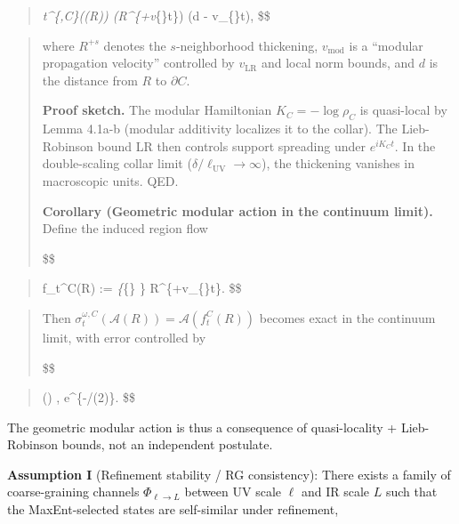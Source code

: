 \documentclass[11pt,a4paper]{article}
\theoremstyle{remark}
\begin{document}
\begin{quote}
\sigma\emph{t\^{}\{\omega,C\}((R)) \subseteq {}(R\^{}\{+v}\{\}\textbar t\textbar\})
\quad {} \eta(d - v\_\{\}\textbar t\textbar),
\$\$
\end{quote}

\begin{quote}
where \(R^{+s}\) denotes the \(s\)-neighborhood thickening, \(v_{\mathrm{mod}}\) is a
``modular propagation velocity'' controlled by \(v_{\mathrm{LR}}\) and local norm
bounds, and \(d\) is the distance from \(R\) to \(\partial C\).

\textbf{Proof sketch.} The modular Hamiltonian \(K_C = -\log \rho_C\) is quasi-local
by Lemma 4.1a-b (modular additivity localizes it to the collar). The
Lieb-Robinson bound LR then controls support spreading under \(e^{iK_C t}\).
In the double-scaling collar limit (\(\delta/\ell_{\mathrm{UV}} \to \infty\)),
the thickening vanishes in macroscopic units. QED.

\textbf{Corollary (Geometric modular action in the continuum limit).} Define the
induced region flow

\$\$
\end{quote}

\begin{quote}
f\_t\^{}C(R) := \lim\emph{\{\ell}\{\} \} R\^{}\{+v\_\{\}\textbar t\textbar\}.
\$\$
\end{quote}

\begin{quote}
Then \(\sigma_t^{\omega,C}(\mathcal{A}(R)) = \mathcal{A}(f_t^C(R))\) becomes
exact in the continuum limit, with error controlled by

\$\$
\end{quote}

\begin{quote}
\eta(\delta)  , e\^{}\{-\delta/(2\xi)\}.
\$\$
\end{quote}

The geometric modular action is thus a consequence of quasi-locality + Lieb-Robinson bounds, not an independent postulate.

\textbf{Assumption I} (Refinement stability / RG consistency): There exists a family
of coarse-graining channels \(\Phi_{\ell\to L}\) between UV scale \(\ell\) and IR
scale \(L\) such that the MaxEnt-selected states are self-similar under
refinement,
\end{document}
